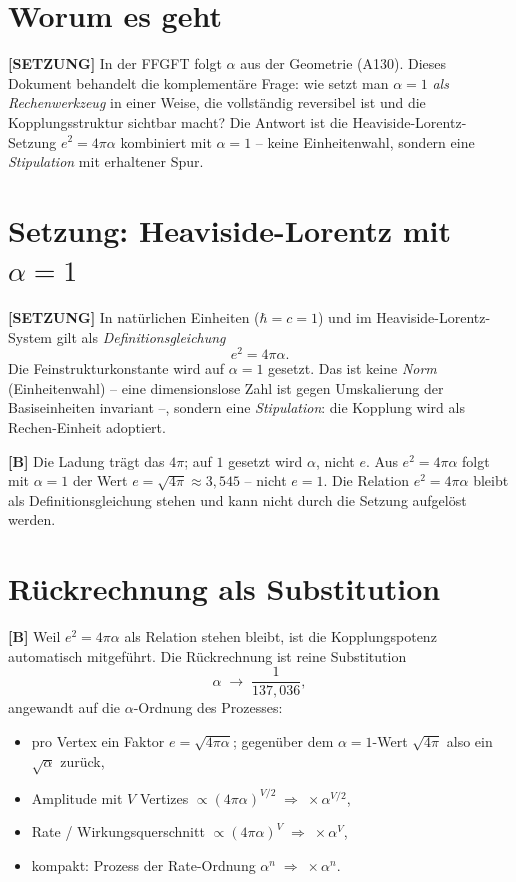 \section{Worum es geht}

\textbf{[SETZUNG]} In der FFGFT folgt $\alpha$ aus der Geometrie (A130).
Dieses Dokument behandelt die komplementäre Frage: wie setzt man $\alpha=1$
\emph{als Rechenwerkzeug} in einer Weise, die vollständig reversibel ist
und die Kopplungsstruktur sichtbar macht? Die Antwort ist die
Heaviside-Lorentz-Setzung $e^2=4\pi\alpha$ kombiniert mit $\alpha=1$ --
keine Einheitenwahl, sondern eine \emph{Stipulation} mit erhaltener Spur.

\section{Setzung: Heaviside-Lorentz mit $\alpha = 1$}

\textbf{[SETZUNG]} In natürlichen Einheiten ($\hbar=c=1$) und im
Heaviside-Lorentz-System gilt als \emph{Definitionsgleichung}
\[
  e^2 = 4\pi\alpha.
\]
Die Feinstrukturkonstante wird auf $\alpha=1$ gesetzt. Das ist keine
\emph{Norm} (Einheitenwahl) -- eine dimensionslose Zahl ist gegen
Umskalierung der Basiseinheiten invariant --, sondern eine
\emph{Stipulation}: die Kopplung wird als Rechen-Einheit adoptiert.

\textbf{[B]} Die Ladung trägt das $4\pi$; auf $1$ gesetzt wird $\alpha$,
nicht $e$. Aus $e^2=4\pi\alpha$ folgt mit $\alpha=1$ der Wert
$e=\sqrt{4\pi}\approx3{,}545$ -- nicht $e=1$. Die Relation $e^2=4\pi\alpha$
bleibt als Definitionsgleichung stehen und kann nicht durch die Setzung
aufgelöst werden.

\section{Rückrechnung als Substitution}

\textbf{[B]} Weil $e^2=4\pi\alpha$ als Relation stehen bleibt, ist die
Kopplungspotenz automatisch mitgeführt. Die Rückrechnung ist reine Substitution
\[
  \alpha \;\longrightarrow\; \frac{1}{137{,}036},
\]
angewandt auf die $\alpha$-Ordnung des Prozesses:
\begin{itemize}[leftmargin=2em,itemsep=2pt,topsep=2pt]
  \item pro Vertex ein Faktor $e=\sqrt{4\pi\alpha}$; gegenüber dem
    $\alpha{=}1$-Wert $\sqrt{4\pi}$ also ein $\sqrt\alpha$ zurück,
  \item Amplitude mit $V$ Vertizes $\propto(4\pi\alpha)^{V/2}
    \;\Rightarrow\;\times\alpha^{V/2}$,
  \item Rate / Wirkungsquerschnitt $\propto(4\pi\alpha)^V
    \;\Rightarrow\;\times\alpha^V$,
  \item kompakt: Prozess der Rate-Ordnung $\alpha^n
    \;\Rightarrow\;\times\alpha^n$.
\end{itemize}


